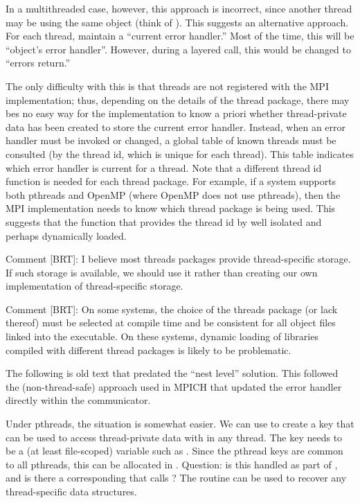 \documentclass{article}
\begin{document}
In a multithreaded case, however, this approach is incorrect, since
another thread may be using the same object (think of
).  This suggests an alternative approach.
For each thread, maintain a ``current error handler.''  Most of the
time, this will be ``object's error handler''.  However, during a
layered call, this would be changed to ``errors return.''  

The only difficulty with this is that threads are not registered with
the MPI implementation; thus, depending on the details of the thread package,
there may bes no easy way for the implementation
to know a priori whether thread-private data has been created to store
the current error handler.  Instead, when an error handler must be
invoked or changed, a global table of known threads must be consulted
(by the thread id, which is unique for each thread).  This table
indicates which error handler is current for a thread.  
Note that a different thread id function is needed for each thread
package.  For example, if a system supports both pthreads and OpenMP
(where OpenMP does not use pthreads), then the MPI implementation
needs to know which thread package is being used.  This suggests that
the function that provides the thread id by well isolated and perhaps
dynamically loaded.

Comment [BRT]: I believe most threads packages provide thread-specific
storage.  If such storage is available, we should use it rather than
creating our own implementation of thread-specific storage.

Comment [BRT]: On some systems, the choice of the threads package (or
lack thereof) must be selected at compile time and be consistent for
all object files linked into the executable.  On these systems,
dynamic loading of libraries compiled with different thread packages
is likely to be problematic.

The following is old text that predated the ``nest level'' solution.  This
followed the (non-thread-safe) approach used in MPICH that updated the error
handler directly within the communicator.

Under pthreads, the situation is somewhat easier.  We can use
 to create a key that can be used to access
thread-private data with  in any thread.
The key needs to be a (at least file-scoped) variable such as
. 
Since the pthread keys are common to all pthreads, this can be allocated in
.  Question: is this handled as part of
, and is there a corresponding
 that calls ?
The routine  can be used to recover any
thread-specific data structures. 
\end{document}
